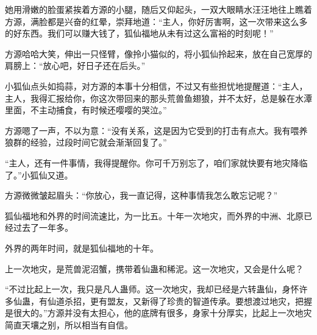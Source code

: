 \begin{this_body}
她用滑嫩的脸蛋紧挨着方源的小腿，随后又仰起头，一双大眼睛水汪汪地往上瞧着方源，满脸都是兴奋的红晕，崇拜地道：“主人，你好厉害啊，这一次带来这么多的好东西。我们可以赚大钱了，狐仙福地从未有过这么富裕的时刻呢！”

方源哈哈大笑，伸出一只怪臂，像拎小猫似的，将小狐仙拎起来，放在自己宽厚的肩膀上：“放心吧，好日子还在后头。”

小狐仙点头如捣蒜，对方源的本事十分相信，不过又有些担忧地提醒道：“主人，主人，我得汇报给你，你这次带回来的那头荒兽鱼翅狼，并不太好，总是躲在水潭里面，不主动捕食，有时候还嘤嘤的哭泣。”

方源嗯了一声，不以为意：“没有关系，这是因为它受到的打击有点大。我有喂养狼群的经验，过段时间它就会渐渐回复了。”

“主人，还有一件事情，我得提醒你。你可千万别忘了，咱们家就快要有地灾降临了。”小狐仙又道。

方源微微皱起眉头：“你放心，我一直记得，这种事情我怎么敢忘记呢？”

狐仙福地和外界的时间流速比，为一比五。十年一次地灾，而外界的中洲、北原已经过去了一年多。

外界的两年时间，就是狐仙福地的十年。

上一次地灾，是荒兽泥沼蟹，携带着仙蛊和稀泥。这一次地灾，又会是什么呢？

“不过比起上一次，我只是凡人蛊师。这一次地灾，我却已经是六转蛊仙，身怀许多仙蛊，有仙道杀招，更有盟友，又新得了珍贵的智道传承。要想渡过地灾，把握是很大的。”方源并没有太担心，他的底牌有很多，身家十分厚实，比起上一次地灾简直天壤之别，所以相当有自信。

\end{this_body}

